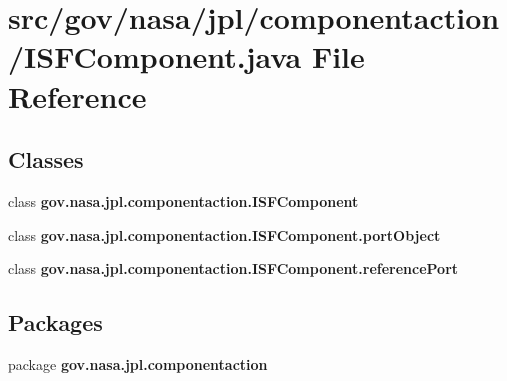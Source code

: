 \section{src/gov/nasa/jpl/componentaction/\+I\+S\+F\+Component.java File Reference}
\label{_i_s_f_component_8java}
\subsection*{Classes}
\begin{DoxyCompactItemize}
\item 
class {\bf gov.\+nasa.\+jpl.\+componentaction.\+I\+S\+F\+Component}
\item 
class {\bf gov.\+nasa.\+jpl.\+componentaction.\+I\+S\+F\+Component.\+port\+Object}
\item 
class {\bf gov.\+nasa.\+jpl.\+componentaction.\+I\+S\+F\+Component.\+reference\+Port}
\end{DoxyCompactItemize}
\subsection*{Packages}
\begin{DoxyCompactItemize}
\item 
package {\bf gov.\+nasa.\+jpl.\+componentaction}
\end{DoxyCompactItemize}
